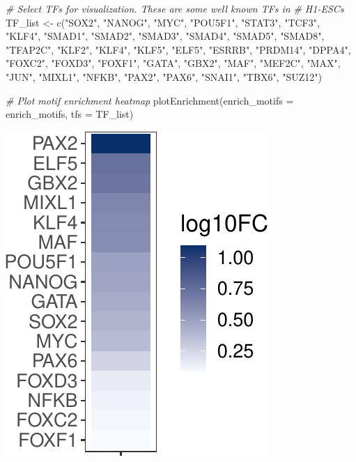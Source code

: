 \documentclass[
]{article}
\newenvironment{Shaded}{}{}
\newcommand{\AttributeTok}[1]{\textcolor[rgb]{0.49,0.56,0.16}{#1}}
\newcommand{\CommentTok}[1]{\textcolor[rgb]{0.38,0.63,0.69}{\textit{#1}}}
\newcommand{\FunctionTok}[1]{\textcolor[rgb]{0.02,0.16,0.49}{#1}}
\newcommand{\NormalTok}[1]{#1}
\newcommand{\OtherTok}[1]{\textcolor[rgb]{0.00,0.44,0.13}{#1}}
\newcommand{\StringTok}[1]{\textcolor[rgb]{0.25,0.44,0.63}{#1}}
\begin{document}
\begin{Shaded}
\begin{Highlighting}[]
\CommentTok{\# Select TFs for visualization. These are some well known TFs in }
\CommentTok{\# H1{-}ESCs}
\NormalTok{TF\_list }\OtherTok{\textless{}{-}} \FunctionTok{c}\NormalTok{(}\StringTok{"SOX2"}\NormalTok{, }\StringTok{"NANOG"}\NormalTok{, }\StringTok{"MYC"}\NormalTok{, }\StringTok{"POU5F1"}\NormalTok{, }\StringTok{"STAT3"}\NormalTok{, }\StringTok{"TCF3"}\NormalTok{, }\StringTok{"KLF4"}\NormalTok{, }\StringTok{"SMAD1"}\NormalTok{,}
             \StringTok{"SMAD2"}\NormalTok{, }\StringTok{"SMAD3"}\NormalTok{, }\StringTok{"SMAD4"}\NormalTok{, }\StringTok{"SMAD5"}\NormalTok{, }\StringTok{"SMAD8"}\NormalTok{, }\StringTok{"TFAP2C"}\NormalTok{, }\StringTok{"KLF2"}\NormalTok{, }
             \StringTok{"KLF4"}\NormalTok{, }\StringTok{"KLF5"}\NormalTok{, }\StringTok{"ELF5"}\NormalTok{, }\StringTok{"ESRRB"}\NormalTok{, }\StringTok{"PRDM14"}\NormalTok{, }\StringTok{"DPPA4"}\NormalTok{, }\StringTok{"FOXC2"}\NormalTok{, }
             \StringTok{"FOXD3"}\NormalTok{, }\StringTok{"FOXF1"}\NormalTok{, }\StringTok{"GATA"}\NormalTok{, }\StringTok{"GBX2"}\NormalTok{, }\StringTok{"MAF"}\NormalTok{, }\StringTok{"MEF2C"}\NormalTok{, }\StringTok{"MAX"}\NormalTok{, }\StringTok{"JUN"}\NormalTok{, }
             \StringTok{"MIXL1"}\NormalTok{, }\StringTok{"NFKB"}\NormalTok{, }\StringTok{"PAX2"}\NormalTok{, }\StringTok{"PAX6"}\NormalTok{, }\StringTok{"SNAI1"}\NormalTok{, }\StringTok{"TBX6"}\NormalTok{, }\StringTok{"SUZ12"}\NormalTok{)}

\CommentTok{\# Plot motif enrichment heatmap}
\FunctionTok{plotEnrichment}\NormalTok{(}\AttributeTok{enrich\_motifs =}\NormalTok{ enrich\_motifs,}
               \AttributeTok{tfs =}\NormalTok{ TF\_list)}
\end{Highlighting}
\end{Shaded}

\includegraphics{enrichmotifpairR_user_manual_guide_files/figure-latex/H1_ESC_4-1.pdf}
\end{document}

